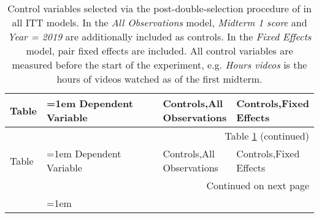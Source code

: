 \begin{spacing}{1.0}\centering 
\begin{longtable}{p{0.1\linewidth} >{\hangindent=1em}p{0.5\linewidth} p{0.2\linewidth} p{0.2\linewidth}}
\caption{Control variables selected via the post-double-selection procedure of \textcite{bch2014a} in all ITT models. In the \textit{All Observations} model, \textit{Midterm 1 score} and \textit{Year = 2019} are additionally included as controls. In the \textit{Fixed Effects} model, pair fixed effects are included. All control variables are measured before the start of the experiment, e.g. \textit{Hours videos} is the hours of videos watched as of the first midterm.} \label{controlvars_selected_itt}\\ 
\toprule 
Table & Dependent Variable & Controls,\newline All Observations & Controls,\newline Fixed Effects \\ 
\midrule 
\endfirsthead 
\multicolumn{4}{r}{{Table \ref{controlvars_selected_itt} (continued)}} \\ 
\toprule
   Table &                         Dependent Variable &                  Controls,\newline All Observations &                                            Controls,\newline Fixed Effects \\
\midrule
\endhead
\midrule
\multicolumn{4}{r}{{Continued on next page}} \\
\midrule
\endfoot


\end{longtable}
\end{spacing}
